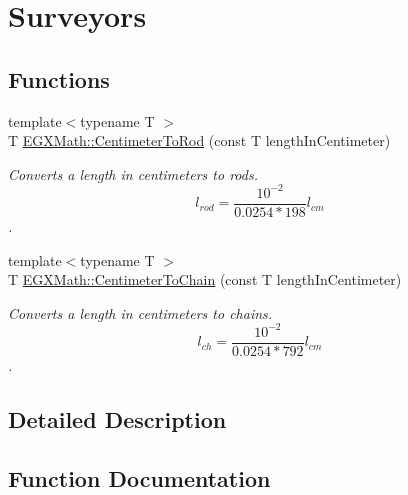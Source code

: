 \hypertarget{group___e_g_x_math-_conversions-_length_conversions-_centimeter-_surveyors}{}\section{Surveyors}
\label{group___e_g_x_math-_conversions-_length_conversions-_centimeter-_surveyors}
\subsection*{Functions}
\begin{DoxyCompactItemize}
\item 
{\footnotesize template$<$typename T $>$ }\\T \mbox{\hyperlink{group___e_g_x_math-_conversions-_length_conversions-_centimeter-_surveyors_gae8148fd547fed6b4308b4ba4b54c2273}{E\+G\+X\+Math\+::\+Centimeter\+To\+Rod}} (const T length\+In\+Centimeter)
\begin{DoxyCompactList}\small\item\em Converts a length in centimeters to rods. \[ l_{rod}= \frac{10^{-2}}{0.0254 * 198} l_{cm} \]. \end{DoxyCompactList}\item 
{\footnotesize template$<$typename T $>$ }\\T \mbox{\hyperlink{group___e_g_x_math-_conversions-_length_conversions-_centimeter-_surveyors_gaec0a2935a1378c75c03f93d48794374a}{E\+G\+X\+Math\+::\+Centimeter\+To\+Chain}} (const T length\+In\+Centimeter)
\begin{DoxyCompactList}\small\item\em Converts a length in centimeters to chains. \[ l_{ch}= \frac{10^{-2}}{0.0254 * 792} l_{cm} \]. \end{DoxyCompactList}\end{DoxyCompactItemize}


\subsection{Detailed Description}


\subsection{Function Documentation}
\mbox{\label{group___e_g_x_math-_conversions-_length_conversions-_centimeter-_surveyors_gaec0a2935a1378c75c03f93d48794374a}} 
